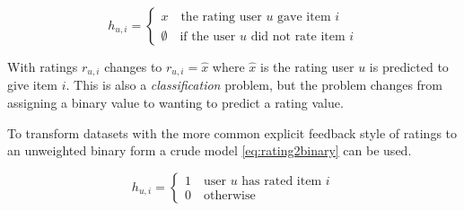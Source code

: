 \begin{equation}\label{eq:rhist}
    h_{u, i} = \begin{cases}
        x \quad \text{the rating user $u$ gave item $i$} \\
        \emptyset \quad \text{if the user $u$ did not rate item $i$}
    \end{cases}
\end{equation}

With ratings $r_{u, i}$ changes to $r_{u, i} = \hat{x}$ where $\hat{x}$ is the rating user $u$ is predicted to give item $i$. This is also a \textit{classification} problem, but the problem changes from assigning a binary value to wanting to predict a rating value.

To transform datasets with the more common explicit feedback style of ratings to an unweighted binary form a crude model \eqref{eq:rating2binary} can be used.

\begin{equation} \label{eq:rating2binary}
    h_{u, i} = \begin{cases}
        1 \quad \text{user $u$ has rated item $i$} \\
        0 \quad \text{otherwise}
    \end{cases}
\end{equation}

